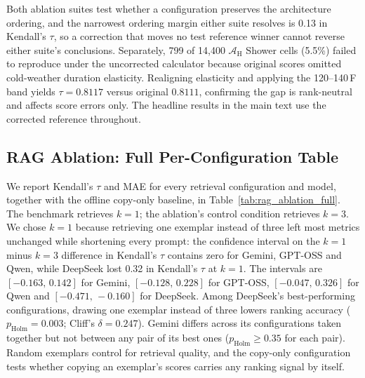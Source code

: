\documentclass[11pt]{article}
\begin{document}
Both ablation suites test whether a configuration preserves the architecture ordering, and the narrowest ordering margin either suite resolves is 0.13 in Kendall's $\tau$, so a correction that moves no test reference winner cannot reverse either suite's conclusions. Separately, 799 of 14,400 $\mathcal{A}_{\text{H}}$ Shower cells (5.5\%) failed to reproduce under the uncorrected calculator because original scores omitted cold-weather duration elasticity. Realigning elasticity and applying the 120--140\,\textdegree{}F band yields $\tau = 0.8117$ versus original $0.8111$, confirming the gap is rank-neutral and affects score errors only. The headline results in the main text use the corrected reference throughout.

\subsection{RAG Ablation: Full Per-Configuration Table}
\label{app:rag_ablation_full}

We report Kendall's $\tau$ and MAE for every retrieval configuration and model, together with the offline copy-only baseline, in Table~\ref{tab:rag_ablation_full}. The benchmark retrieves $k=1$; the ablation's control condition retrieves $k=3$. We chose $k=1$ because retrieving one exemplar instead of three left most metrics unchanged while shortening every prompt: the confidence interval on the $k=1$ minus $k=3$ difference in Kendall's $\tau$ contains zero for Gemini, GPT-OSS and Qwen, while DeepSeek lost 0.32 in Kendall's $\tau$ at $k=1$. The intervals are $[-0.163,\,0.142]$ for Gemini, $[-0.128,\,0.228]$ for GPT-OSS, $[-0.047,\,0.326]$ for Qwen and $[-0.471,\,-0.160]$ for DeepSeek. Among DeepSeek's best-performing configurations, drawing one exemplar instead of three lowers ranking accuracy ($p_{\text{Holm}} = 0.003$; Cliff's $\delta = 0.247$). Gemini differs across its configurations taken together but not between any pair of its best ones ($p_{\text{Holm}} \geq 0.35$ for each pair). Random exemplars control for retrieval quality, and the copy-only configuration tests whether copying an exemplar's scores carries any ranking signal by itself.
\end{document}
